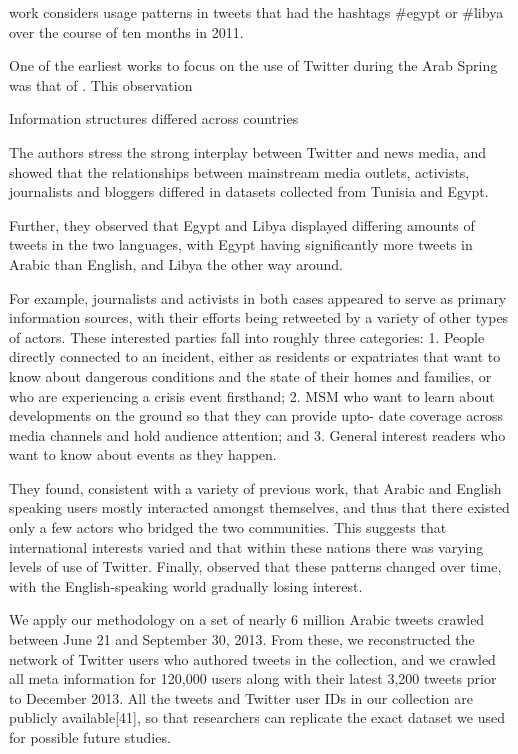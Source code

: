 \cite{bruns_arab_2013} work considers usage patterns in tweets that had the hashtags \#egypt or \#libya over the course of ten months in 2011.  

One of the earliest works to focus on the use of Twitter during the Arab Spring was that of \cite{lotan_revolutions_2011}. This observation 

Information structures differed across countries 

	\cite{lotan_revolutions_2011}
		 The authors stress the strong interplay between Twitter and news media, and showed that the relationships between mainstream media outlets, activists, journalists and bloggers differed in datasets collected from Tunisia and Egypt. 

	\cite{bruns_arab_2013}
		Further, they observed that Egypt and Libya displayed differing amounts of tweets in the two languages, with Egypt having significantly more tweets in Arabic than English, and Libya the other way around.

\cite{lotan_revolutions_2011}
For example, journalists and activists in both cases appeared to serve as primary information sources, with their efforts being retweeted by a variety of other types of actors.    
These interested parties fall into roughly three categories:
1. People directly connected to an incident, either as residents or expatriates that want to
know about dangerous conditions and the state of their homes and families, or who are
experiencing a crisis event firsthand;
2. MSM who want to learn about developments on the ground so that they can provide upto-
date coverage across media channels and hold audience attention; and
3. General interest readers who want to know about events as they happen.

\cite{bruns_arab_2013}   They found, consistent with a variety of previous work, that Arabic and English speaking users mostly interacted amongst themselves, and thus that there existed only a few actors who bridged the two communities.    This suggests that international interests varied and that within these nations there was varying levels of use of Twitter.  Finally, \cite{bruns_arab_2013} observed that these patterns changed over time, with the English-speaking world gradually losing interest. 	

\cite{borge-holthoefer_content_2014}

	We apply our methodology on a set of nearly 6 million Arabic tweets crawled between June 21 and September 30, 2013. From these, we reconstructed the network of Twitter users who authored tweets in the collection, and we crawled all meta information for 120,000 users along with their latest 3,200 tweets prior to December 2013. All the tweets and Twitter user IDs in our collection are publicly available[41], so that researchers can replicate the exact dataset we used for possible future studies.
	
